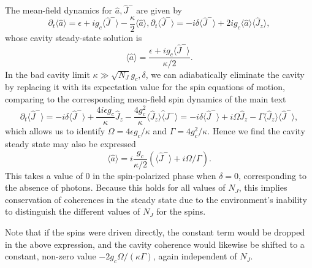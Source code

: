 \documentclass[11pt]{article}
\begin{document}
The mean-field dynamics for $\hat a, \hat J^-$ are given by
\begin{subequations}
\begin{equation}
    \partial_t \langle \hat a \rangle  =  \epsilon + i g_c \langle \hat J^-\rangle  - \frac{\kappa}{2} \langle \hat a\rangle,
\end{equation}
\begin{equation}
    \partial_t \langle \hat J^- \rangle = - i \delta \langle \hat J^- \rangle + 2i g_c \langle \hat a \rangle \langle \hat J_z \rangle,
\end{equation}
\end{subequations}
whose cavity steady-state solution is 
\begin{equation}
     \langle \hat a\rangle = \frac{\epsilon + i g_c \langle \hat J^- \rangle}{\kappa/2}.
\end{equation}
In the bad cavity limit $\kappa \gg \sqrt{N_J}g_c, \delta$, we can adiabatically eliminate the cavity by replacing it with its expectation value for the spin equations of motion, comparing to the corresponding mean-field spin dynamics of the main text
\begin{equation}
    \partial_t \langle \hat J^- \rangle = - i \delta \langle \hat J^- \rangle + \frac{4 i \epsilon g_c}{\kappa} \hat J_z - \frac{4 g_c^2}{\kappa} \langle \hat J_z \rangle \hat \langle J^- \rangle = - i \delta \langle \hat J^- \rangle + i \Omega \hat J_z - \Gamma \langle \hat J_z \rangle \langle \hat J^- \rangle, 
\end{equation}
which allows us to identify $\Omega = 4 \epsilon g_c/\kappa$ and $\Gamma = 4g_c^2/\kappa$. Hence we find the cavity steady state may also be expressed
\begin{equation}
\label{eq:aMF}
    \langle \hat a \rangle = i \frac{g_c}{\kappa/2}(\langle \hat J^-\rangle + i\Omega/\Gamma).
\end{equation}
This takes a value of 0 in the spin-polarized phase when $\delta = 0$, corresponding to the absence of photons. Because this holds for all values of $N_J$, this implies conservation of coherences in the steady state due to the environment's inability to distinguish the different values of $N_J$ for the spins.

Note that if the spins were driven directly, the constant term would be dropped in the above expression, and the cavity coherence would likewise be shifted to a constant, non-zero value $-2 g_c \Omega/(\kappa \Gamma)$, again independent of $N_J$.
\end{document}
